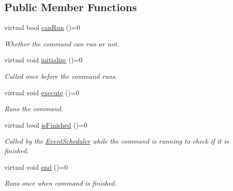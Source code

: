 \subsection*{Public Member Functions}
\begin{DoxyCompactItemize}
\item 
virtual bool \mbox{\hyperlink{classlib_iterative_robot_1_1_command_aebef0fdf029a15ee48fbb778c4265609}{can\+Run}} ()=0
\begin{DoxyCompactList}\small\item\em Whether the command can run or not. \end{DoxyCompactList}\item 
virtual void \mbox{\hyperlink{classlib_iterative_robot_1_1_command_a14543c9d38b07e52f9ffb2af88a63f60}{initialize}} ()=0
\begin{DoxyCompactList}\small\item\em Called once before the command runs. \end{DoxyCompactList}\item 
\mbox{\label{classlib_iterative_robot_1_1_command_a4b38164af1a8645fae2fdae296317cf4}} 
virtual void \mbox{\hyperlink{classlib_iterative_robot_1_1_command_a4b38164af1a8645fae2fdae296317cf4}{execute}} ()=0
\begin{DoxyCompactList}\small\item\em Runs the command. \end{DoxyCompactList}\item 
virtual bool \mbox{\hyperlink{classlib_iterative_robot_1_1_command_a8e4dccdd88f432a716090f532ba097f7}{is\+Finished}} ()=0
\begin{DoxyCompactList}\small\item\em Called by the \mbox{\hyperlink{classlib_iterative_robot_1_1_event_scheduler}{Event\+Scheduler}} while the command is running to check if it is finished. \end{DoxyCompactList}\item 
\mbox{\label{classlib_iterative_robot_1_1_command_ab30847f09859387b70bb7846f7ce7ca4}} 
virtual void \mbox{\hyperlink{classlib_iterative_robot_1_1_command_ab30847f09859387b70bb7846f7ce7ca4}{end}} ()=0
\begin{DoxyCompactList}\small\item\em Runs once when command is finished. \end{DoxyCompactList}\item 

\end{DoxyCompactItemize}
